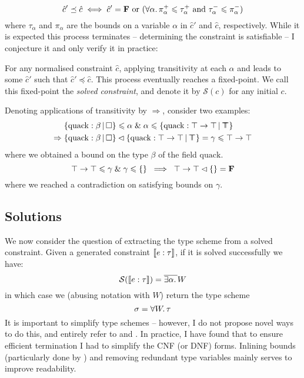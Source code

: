 $$ \hat c' \preceq \hat c \iff \hat c' = \mathbf F \text{ or } (\forall \alpha \ldotp \pi_\alpha^+ \leqslant \tau_\alpha^+ \text{ and } \tau_\alpha^- \leqslant \pi_\alpha^-) $$
where $\tau_\alpha$ and $\pi_\alpha$ are the bounds on a variable $\alpha$ in $\hat c'$ and $\hat c$, respectively.
While it is expected this process terminates \cite{pottier-framework, simple-sub, mlstruct} -- determining the constraint is satisfiable -- I conjecture it and only verify it in practice:
\begin{conjecture}
    For any normalised constraint $\hat c$, applying transitivity at each $\alpha$ and leads to some $\hat c'$ such that $\hat c' \preceq \hat c$. This process eventually reaches a fixed-point. We call this fixed-point the \emph{solved constraint}, and denote it by $\mathcal S(c)$ for any initial $c$.
\end{conjecture}

\begin{example}
    Denoting applications of transitivity by $\Rightarrow$, consider two examples:
    \begin{align*}
        & \flext{\mathrm{quack}: \beta}{\flabsent} \sub \alpha \und \alpha \sub \flext{\mathrm{quack}: \top \to \top }{\flftop} \\
        \Rightarrow\;& \flext{\mathrm{quack}: \beta}{\flabsent} \cdecomp \flext{\mathrm{quack}: \top \to \top }{\flftop} = \gamma \sub \top \to \top
    \end{align*}
    where we obtained a bound on the type $\beta$ of the field $\mathrm{quack}$.
    $$ \top \to \top \sub \gamma \und \gamma \sub \flrec{} \;\implies\; \top \to \top \cdecomp \flrec{} = \fals $$
    where we reached a contradiction on satisfying bounds on $\gamma$.
\end{example}

\subsection{Solutions}
\label{subsec:simplification}

We now consider the question of extracting the type scheme from a solved constraint. Given a generated constraint $\denot{e : \tau}$, if it is solved successfully we have:
$$ \mathcal S \left( \denot{e : \tau} \right) = \overline{\exists \alpha \ldotp {}} \sbnd $$
in which case we (abusing notation with $W$) return the type scheme
$$ \sigma =  \forall W \ldotp \tau $$
It is important to simplify type schemes -- however, I do not propose novel ways to do this, and entirely refer to \textcite{simple-sub} and \textcite{mlstruct}. In practice, I have found that to ensure efficient termination I had to simplify the CNF (or DNF) forms. Inlining bounds (particularly done by \textcite{dolan-thesis}) and removing redundant type variables mainly serves to improve readability.

